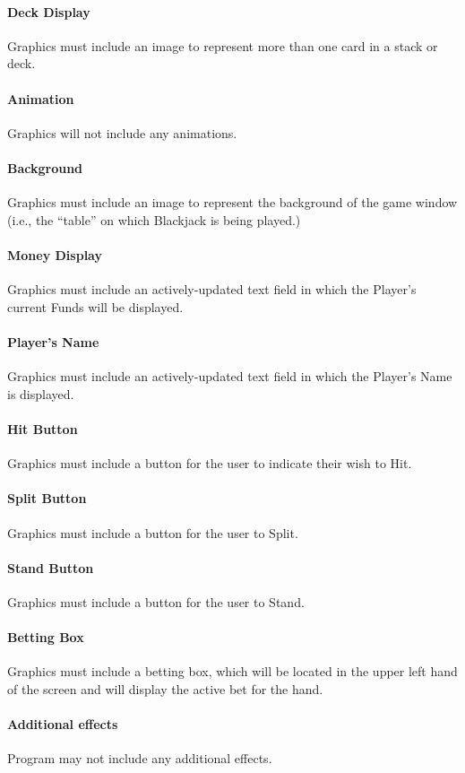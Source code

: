 \documentclass[12pt]{article}
\begin{document}
\paragraph{Deck Display}
Graphics must include an image to represent more than one card in a stack or
deck.
\paragraph{Animation}
Graphics will not include any animations.
\paragraph{Background}
Graphics must include an image to represent the background of the game window
(i.e., the ``table'' on which Blackjack is being played.)
\paragraph{Money Display}
Graphics must include an actively-updated text field in which the Player's
current Funds will be displayed.
\paragraph{Player's Name}
Graphics must include an actively-updated text field in which the Player's Name
is displayed.
\paragraph{Hit Button}
Graphics must include a button for the user to indicate their wish to Hit.
\paragraph{Split Button}
Graphics must include a button for the user to Split.
\paragraph{Stand Button	}
Graphics must include a button for the user to Stand.
\paragraph{Betting Box}
Graphics must include a betting box, which will be located in the upper left
hand of the screen and will display the active bet for the hand. 
\paragraph{Additional effects}
Program may not include any additional effects.
\end{document}
